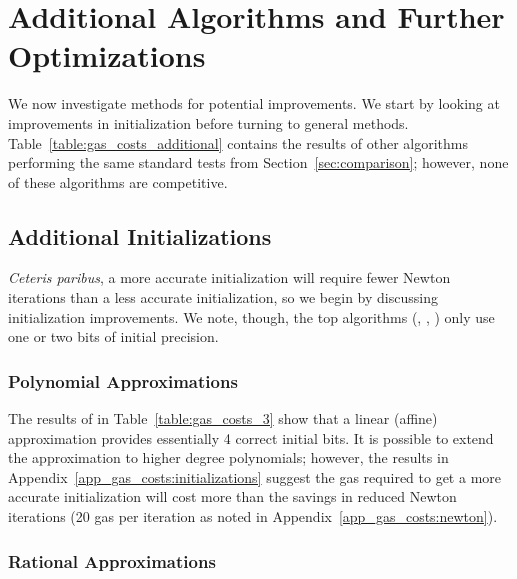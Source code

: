\section{Additional Algorithms and Further Optimizations}
\label{app:algs_optimizations}

We now investigate methods for potential improvements.
We start by looking at improvements in initialization
before turning to general methods.
Table~\ref{table:gas_costs_additional} contains the results
of other algorithms performing the same standard tests
from Section~\ref{sec:comparison};
however, none of these algorithms are competitive.




\subsection{Additional Initializations}
\label{app:algs_opt_init}

\emph{Ceteris paribus},
a more accurate initialization will require fewer Newton iterations
than a less accurate initialization,
so we begin by discussing initialization improvements.
We note, though, the top algorithms
(\UnrolledThree{}, \UnrolledOne{}, \UnrolledTwo{})
only use one or two bits of initial precision.

\subsubsection{Polynomial Approximations}
\label{app:algs_opt_polynomial}

The results of \Linear{} in Table~\ref{table:gas_costs_3}
show that a linear (affine) approximation provides
essentially 4 correct initial bits.
It is possible to extend the approximation
to higher degree polynomials;
however, the results in Appendix~\ref{app_gas_costs:initializations}
suggest the gas required to get a more accurate initialization
will cost more than the savings in reduced Newton iterations
(20 gas per iteration as noted in Appendix~\ref{app_gas_costs:newton}).

\subsubsection{Rational Approximations}
\label{app:algs_opt_rational}

